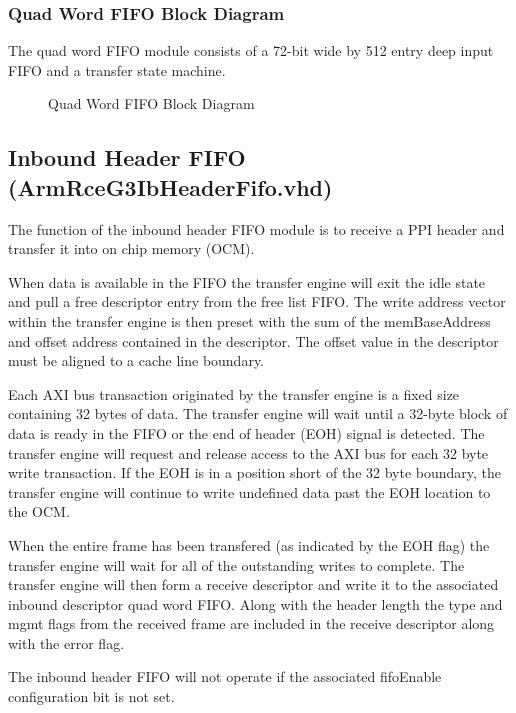\documentclass[11pt]{article}
\begin{document}
\subsubsection{Quad Word FIFO Block Diagram}

The quad word FIFO module consists of a 72-bit wide by 512 entry deep input FIFO and a transfer state machine.

\begin{figure}[H]
   \centering
   \caption{Quad Word FIFO Block Diagram}
   \label{fig:qw_fifo_block}
\end{figure}

\subsection{Inbound Header FIFO (ArmRceG3IbHeaderFifo.vhd)}
\label{subsec:ArmRceG3IbHeaderFifo}

The function of the inbound header FIFO module is to receive a PPI header and transfer it into on chip memory (OCM). 

When data is available in the FIFO the transfer engine will exit the idle state and pull a free descriptor entry
from the free list FIFO. The write address vector within the transfer engine is then preset with the sum of the
memBaseAddress and offset address contained in the descriptor. The offset value in the descriptor must be aligned to 
a cache line boundary.

Each AXI bus transaction originated by the transfer engine is a fixed size containing 32 bytes of data. 
The transfer engine will wait until a 32-byte block of data is ready in the FIFO or the end
of header (EOH) signal is detected. The transfer engine will request and release access to the AXI bus for each 32 byte
write transaction. If the EOH is in a position short of the 32 byte boundary, the transfer engine will continue to write
undefined data past the EOH location to the OCM.

When the entire frame has been transfered (as indicated by the EOH flag) the transfer engine will 
wait for all of the outstanding writes to complete. The transfer engine will then form a receive descriptor and 
write it to the associated inbound descriptor quad word FIFO. Along with the header length the type and mgmt flags 
from the received frame are included in the receive descriptor along with the error flag.

The inbound header FIFO will not operate if the associated fifoEnable configuration bit is not set.
\end{document}
